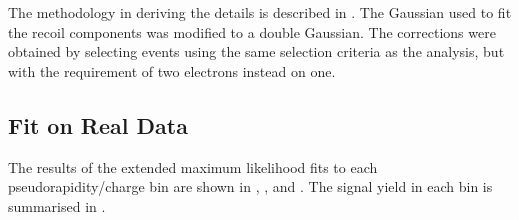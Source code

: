 The methodology in deriving the details is described in .
The Gaussian used to fit the recoil components was modified to a double
Gaussian. 
The corrections were obtained by selecting \HepProcess{\PZ\to\Pe\Pe} events
using the same selection criteria as the analysis, but with the requirement of
two electrons instead on one.

\subsection{Fit on Real Data}
The results of the extended maximum likelihood fits to each pseudorapidity/charge
bin are shown in , ,  and
.
The signal yield in each bin is summarised in  .


